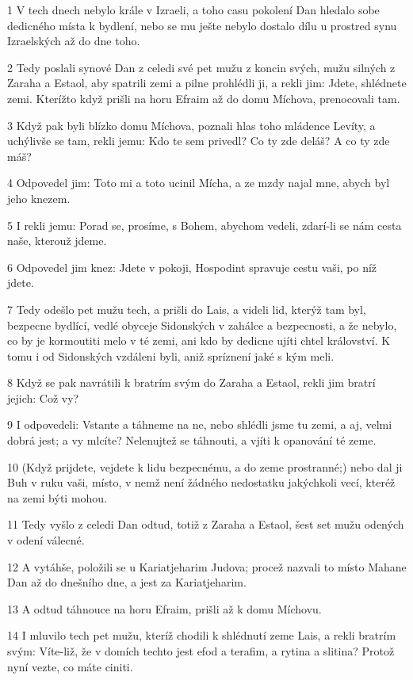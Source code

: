 \par 1 V tech dnech nebylo krále v Izraeli, a toho casu pokolení Dan hledalo sobe dedicného místa k bydlení, nebo se mu ješte nebylo dostalo dílu u prostred synu Izraelských až do dne toho.
\par 2 Tedy poslali synové Dan z celedi své pet mužu z koncin svých, mužu silných z Zaraha a Estaol, aby spatrili zemi a pilne prohlédli ji, a rekli jim: Jdete, shlédnete zemi. Kterížto když prišli na horu Efraim až do domu Míchova, prenocovali tam.
\par 3 Když pak byli blízko domu Míchova, poznali hlas toho mládence Levíty, a uchýlivše se tam, rekli jemu: Kdo te sem privedl? Co ty zde deláš? A co ty zde máš?
\par 4 Odpovedel jim: Toto mi a toto ucinil Mícha, a ze mzdy najal mne, abych byl jeho knezem.
\par 5 I rekli jemu: Porad se, prosíme, s Bohem, abychom vedeli, zdarí-li se nám cesta naše, kterouž jdeme.
\par 6 Odpovedel jim knez: Jdete v pokoji, Hospodint spravuje cestu vaši, po níž jdete.
\par 7 Tedy odešlo pet mužu tech, a prišli do Lais, a videli lid, kterýž tam byl, bezpecne bydlící, vedlé obyceje Sidonských v zahálce a bezpecnosti, a že nebylo, co by je kormoutiti melo v té zemi, ani kdo by dedicne ujíti chtel království. K tomu i od Sidonských vzdáleni byli, aniž spríznení jaké s kým meli.
\par 8 Když se pak navrátili k bratrím svým do Zaraha a Estaol, rekli jim bratrí jejich: Což vy?
\par 9 I odpovedeli: Vstante a táhneme na ne, nebo shlédli jsme tu zemi, a aj, velmi dobrá jest; a vy mlcíte? Nelenujtež se táhnouti, a vjíti k opanování té zeme.
\par 10 (Když prijdete, vejdete k lidu bezpecnému, a do zeme prostranné;) nebo dal ji Buh v ruku vaši, místo, v nemž není žádného nedostatku jakýchkoli vecí, kteréž na zemi býti mohou.
\par 11 Tedy vyšlo z celedi Dan odtud, totiž z Zaraha a Estaol, šest set mužu odených v odení válecné.
\par 12 A vytáhše, položili se u Kariatjeharim Judova; procež nazvali to místo Mahane Dan až do dnešního dne, a jest za Kariatjeharim.
\par 13 A odtud táhnouce na horu Efraim, prišli až k domu Míchovu.
\par 14 I mluvilo tech pet mužu, kteríž chodili k shlédnutí zeme Lais, a rekli bratrím svým: Víte-liž, že v domích techto jest efod a terafim, a rytina a slitina? Protož nyní vezte, co máte ciniti.
